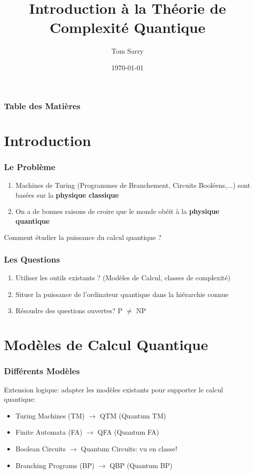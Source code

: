 \documentclass{beamer}
\title[Th\'eorie de la Complexit\'e Quantique]{Introduction \`a la Th\'eorie de Complexit\'e Quantique}
\author{Tom Sarry}
\institute[UdeM]{Universit\'e de Montr\'eal}
\date[]{\today}
\begin{document}
\frame{\titlepage}

\begin{frame}
  \frametitle{Table des Mati\`eres}
  \tableofcontents
\end{frame}


\section{Introduction}

\begin{frame}
  \frametitle{Le Probl\`eme}

  \begin{enumerate}
    \item Machines de Turing (Programmes de Branchement, Circuits Bool\'eens,...) sont bas\'ees sur la \textbf{physique classique}
    \item On a de bonnes raisons de croire que le monde ob\'eit \`a la \textbf{physique quantique}
  \end{enumerate}
  Comment \'etudier la puissance du calcul quantique ?
\end{frame}

\begin{frame}
  \frametitle{Les Questions}

  \begin{enumerate}
    \item Utiliser les outils existants ? (Mod\`eles de Calcul, classes de complexit\'e)
    \item Situer la puissance de l'ordinateur quantique dans la hi\'erarchie connue
    \item R\'esoudre des questions ouvertes? \pause \textsf{P} $\neq$ \textsf{NP}
  \end{enumerate}
\end{frame}

\section{Mod\`eles de Calcul Quantique}

\begin{frame}
  \frametitle{Diff\'erents Mod\`eles}

  Extension logique: adapter les mod\`eles existants pour supporter le calcul quantique:
  \begin{itemize}
    \item Turing Machines (TM) $\rightarrow$ QTM (Quantum TM)
    \item Finite Automata (FA) $\rightarrow$ QFA (Quantum FA)
    \item Boolean Circuits $\rightarrow$ Quantum Circuits: vu en classe!
    \item Branching Programs (BP) $\rightarrow$ QBP (Quantum BP)
  \end{itemize}
\end{frame}
\end{document}
